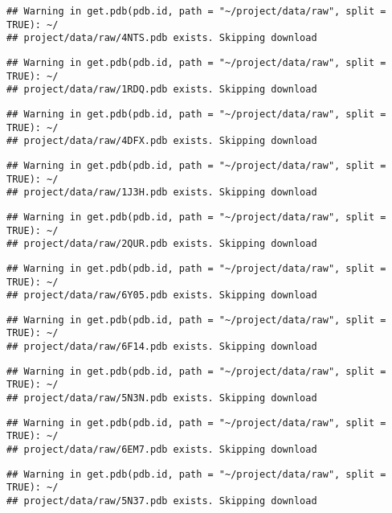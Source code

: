 \documentclass[
]{article}
\begin{document}
\begin{verbatim}
## Warning in get.pdb(pdb.id, path = "~/project/data/raw", split = TRUE): ~/
## project/data/raw/4NTS.pdb exists. Skipping download
\end{verbatim}

\begin{verbatim}
## Warning in get.pdb(pdb.id, path = "~/project/data/raw", split = TRUE): ~/
## project/data/raw/1RDQ.pdb exists. Skipping download
\end{verbatim}

\begin{verbatim}
## Warning in get.pdb(pdb.id, path = "~/project/data/raw", split = TRUE): ~/
## project/data/raw/4DFX.pdb exists. Skipping download
\end{verbatim}

\begin{verbatim}
## Warning in get.pdb(pdb.id, path = "~/project/data/raw", split = TRUE): ~/
## project/data/raw/1J3H.pdb exists. Skipping download
\end{verbatim}

\begin{verbatim}
## Warning in get.pdb(pdb.id, path = "~/project/data/raw", split = TRUE): ~/
## project/data/raw/2QUR.pdb exists. Skipping download
\end{verbatim}

\begin{verbatim}
## Warning in get.pdb(pdb.id, path = "~/project/data/raw", split = TRUE): ~/
## project/data/raw/6Y05.pdb exists. Skipping download
\end{verbatim}

\begin{verbatim}
## Warning in get.pdb(pdb.id, path = "~/project/data/raw", split = TRUE): ~/
## project/data/raw/6F14.pdb exists. Skipping download
\end{verbatim}

\begin{verbatim}
## Warning in get.pdb(pdb.id, path = "~/project/data/raw", split = TRUE): ~/
## project/data/raw/5N3N.pdb exists. Skipping download
\end{verbatim}

\begin{verbatim}
## Warning in get.pdb(pdb.id, path = "~/project/data/raw", split = TRUE): ~/
## project/data/raw/6EM7.pdb exists. Skipping download
\end{verbatim}

\begin{verbatim}
## Warning in get.pdb(pdb.id, path = "~/project/data/raw", split = TRUE): ~/
## project/data/raw/5N37.pdb exists. Skipping download
\end{verbatim}
\end{document}

